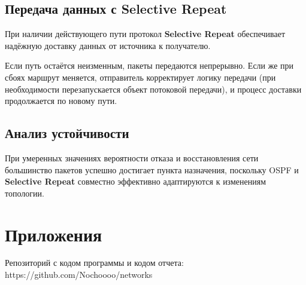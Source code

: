 \documentclass[a4paper,12pt]{article}
\begin{document}
\subsection{Передача данных с Selective Repeat}

При наличии действующего пути протокол \textbf{Selective Repeat} обеспечивает надёжную доставку данных от источника к получателю.

Если путь остаётся неизменным, пакеты передаются непрерывно. Если же при сбоях маршрут меняется, отправитель корректирует логику передачи (при необходимости перезапускается объект потоковой передачи), и процесс доставки продолжается по новому пути.

\subsection{Анализ устойчивости}

При умеренных значениях вероятности отказа и восстановления сети большинство пакетов успешно достигает пункта назначения, поскольку OSPF и \textbf{Selective Repeat} совместно эффективно адаптируются к изменениям топологии.

\section{Приложения}

Репозиторий с кодом программы и кодом отчета: https://github.com/Nochoooo/networks
\end{document}
